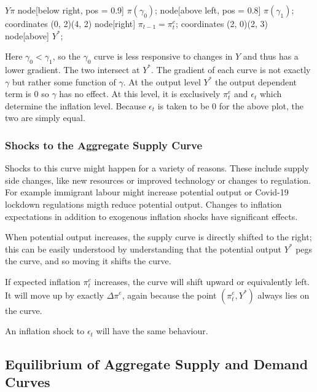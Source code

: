 \documentclass[12pt]{report}
\begin{document}
\begin{flushleft}
\begin{simpleplot}{\(Y\)}{\(\pi\)}
    node[below right, pos = 0.9] {\(\pi(\gamma_0)\)};
    node[above left, pos = 0.8] {\(\pi(\gamma_1)\)};
     coordinates {(0, 2)(4, 2)}
    node[right] {\(\pi_{t - 1} = \pi^e_t\)};
     coordinates {(2, 0)(2, 3)}
    node[above] {\(Y^*\)};
\end{simpleplot}

Here \(\gamma_0 < \gamma_1\), so the \(\gamma_0\) curve is less responsive to
changes in \(Y\) and thus has a lower gradient. The two intersect at \(Y^*\).
The gradient of each curve is not exactly \(\gamma\) but rather some function
of \(\gamma\). At the output level \(Y^*\) the output dependent term is \(0\)
so \(\gamma\) has no effect. At this level, it is exclusively \(\pi^e_t\) and
\(\epsilon_t\) which determine the inflation level. Because \(\epsilon_t\) is
taken to be \(0\) for the above plot, the two are simply equal.

\subsubsection*{Shocks to the Aggregate Supply Curve}

Shocks to this curve might happen for a variety of reasons. These include
supply side changes, like new resources or improved technology or changes to
regulation. For example immigrant labour might increase potential output or 
Covid-19 lockdown regulations migth reduce potential output. Changes to
inflation expectations in addition to exogenous inflation shocks have
significant effects. \par
When potential output increases, the supply curve is directly shifted to the
right; this can be easily understood by understanding that the potential output
\(Y^*\) pegs the curve, and so moving it shifts the curve. \par
If expected inflation \(\pi^e_t\) increases, the curve will shift upward or
equivalently left. It will move up by exactly \(\Delta\pi^e\), again because
the point \((\pi^e_t, Y^*)\) always lies on the curve. \par
An inflation shock to \(\epsilon_t\) will have the same behaviour.

\subsection*{Equilibrium of Aggregate Supply and Demand Curves}


\end{flushleft}
\end{document}
